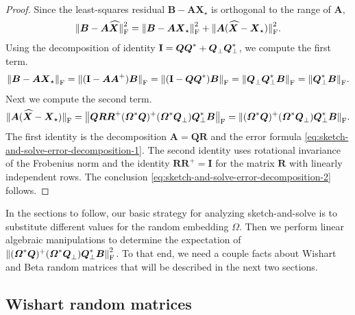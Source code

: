 \documentclass[11pt]{article}
\newcommand{\mat}[1]{\boldsymbol{#1}}
\newcommand{\norm}[1]{\mleft\| #1 \mright\|}
\newcommand{\Id}{\mathbf{I}}
\newcommand{\hatbold}[1]{%
  \skew{4}\widehat{\smash{\boldsymbol{#1}}\mathstrut}}
\newcommand{\Xhat}{\smash{\hatbold{X}}}
\theoremstyle{definition}
\numberwithin{equation}{section}
\begin{document}
\begin{proof}
Since the least-squares residual $\mat{B} - \mat{A}\mat{X}_\star$ is orthogonal to the range of $\mat{A}$,
%
\begin{equation*}
    \norm{\smash{\mat{B} - \mat{A}\Xhat}}_{\rm F}^2 = \norm{\mat{B} - \mat{A}\mat{X}_\star}_{\rm F}^2 + \norm{\smash{\mat{A}(\Xhat - \mat{X}_\star)}}_{\rm F}^2.
\end{equation*}
%
Using the decomposition of identity $\Id = \mat{Q}\mat{Q}^* + \mat{Q}_\perp^{\vphantom{*}} \mat{Q}_\perp^*$, we compute the first term.
%
\begin{equation*}
    \norm{\mat{B} - \mat{A}\mat{X}_\star}_{\rm F}
    = \norm{\smash{(\Id - \mat{A}\mat{A}^+) \mat{B}}}_{\rm F} 
    = \norm{\smash{(\Id - \mat{Q}\mat{Q}^*) \mat{B}}}_{\rm F} 
    = \norm{\smash{\mat{Q}_\perp^{\vphantom{*}}\mat{Q}_\perp^* \mat{B}}}_{\rm F} 
    = \norm{\smash{\mat{Q}_\perp^* \mat{B}}}_{\rm F}.
\end{equation*}
Next we compute the second term.
%
\begin{equation*}
    \norm{\smash{\mat{A}(\Xhat - \mat{X}_\star)}}_{\rm F} = \norm{\smash{\mat{Q}\mat{R}\mat{R}^+}(\mat{\varOmega}^*\mat{Q})^+(\mat{\varOmega}^*\mat{Q}_\perp^{\vphantom{*}}) \mat{Q}_\perp^*\mat{B}}_{\rm F} = \norm{\smash{(\mat{\varOmega}^*\mat{Q})^+(\mat{\varOmega}^*\mat{Q}_\perp^{\vphantom{*}}) \mat{Q}_\perp^*\mat{B}}}_{\rm F}.
\end{equation*}
%
The first identity is the decomposition $\mat{A} = \mat{Q}\mat{R}$ and the error formula \cref{eq:sketch-and-solve-error-decomposition-1}.
The second identity uses rotational invariance of the Frobenius norm and the identity $\mat{R}\mat{R}^+ = \Id$ for the matrix $\mat{R}$ with linearly independent rows.
The conclusion \cref{eq:sketch-and-solve-error-decomposition-2} follows.
\end{proof}

In the sections to follow, our basic strategy for analyzing sketch-and-solve is to substitute different values for the random embedding $\mat{\varOmega}$.
Then we perform linear algebraic manipulations to determine the expectation of $\norm{\smash{(\mat{\varOmega}^*\mat{Q})^+(\mat{\varOmega}^*\mat{Q}_\perp^{\vphantom{*}}) \mat{Q}_\perp^*\mat{B}}}_{\rm F}^2$.
To that end, we need a couple facts about Wishart and Beta random matrices that will be described in the next two sections.

\subsection{Wishart random matrices} \label{sec:wishart}
\end{document}
